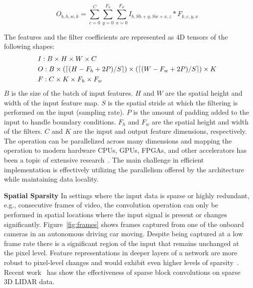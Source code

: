 \documentclass{article}
\begin{document}
\begin{equation}
O_{b, h, w, k} = \sum_{c=0}^{C}\sum_{y=0}^{F_h} \sum_{x=0}^{F_w} I_{b, S h+y, S
    w+x, z} * F_{k, c, y, x}
\label{eqn:conv}
\end{equation}

The features and the filter coefficients are represented as 4D tensors of the
following shapes:
\begin{align*}
& I:B \times H \times W \times C \\
& O:B \times (\lceil (H - F_h + 2P)/S \rceil) \times (\lceil (W - F_w + 2P)/S \rceil) \times K \\
& F:C \times K \times F_h \times F_w
\end{align*}
$B$ is the size of the batch of input features. $H$ and $W$ are the spatial
height and width of the input feature map. $S$ is the spatial stride at which
the filtering is performed on the input (sampling rate). $P$ is the amount of
padding added to the input to handle boundary conditions. $F_h$ and $F_w$ are
the spatial height and width of the filters. $C$ and $K$ are the input and
output feature dimensions, respectively. The operation can be parallelized across
many dimensions and mapping the operation to modern hardware CPUs, GPUs, FPGAs,
and other accelerators has been a topic of extensive
research~\cite{vasilache2014fast, lavin2016fast, liu2018efficient,
jia2018optimizing, tsai2016performance, truong2016latte, chetlur2014cudnn, chen2017eyeriss}. 
The main challenge in efficient implementation is effectively utilizing the parallelism
offered by the architecture while maintaining data locality.

\textbf{Spatial Sparsity} In settings where the input data is sparse or highly
redundant, e.g., consecutive frames of video, the convolution operation can only be
performed in spatial locations where the input signal is present or changes
significantly. Figure~\ref{fig:frames} shows frames captured from one of the
onboard cameras in an autonomous driving car moving. Despite being captured at a
low frame rate there is a significant region of the input that remains unchanged
at the pixel level. Feature representations in deeper layers of a network are
more robust to pixel-level changes and would exhibit even higher levels of
sparsity~\cite{shelhamer2016clockwork}. Recent work~\cite{ren2018sbnet} has show
the effectiveness of sparse block convolutions on sparse 3D LIDAR data.
\end{document}
